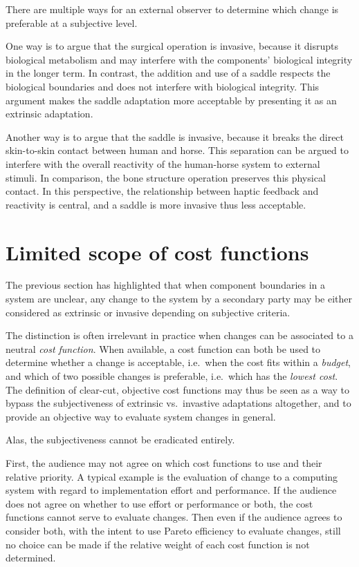 \documentclass[a4paper]{article}
\newcommand{\ie}{i.e.~}
\newcommand{\vs}{vs.~}
\begin{document}
There are multiple ways for an external observer to determine which
change is preferable at a subjective level.

One way is to argue that the surgical operation is invasive, because
it disrupts biological metabolism and may interfere with the
components' biological integrity in the longer term. In contrast, the
addition and use of a saddle respects the biological boundaries and
does not interfere with biological integrity. This argument makes the saddle
adaptation more acceptable by presenting it as an extrinsic
adaptation.

Another way is to argue that the saddle is invasive, because it breaks
the direct skin-to-skin contact between human and horse. This
separation can be argued to interfere with the overall reactivity of
the human-horse system to external stimuli. In comparison, the bone
structure operation preserves this physical contact. In this
perspective, the relationship between haptic feedback and reactivity
is central, and a saddle is more invasive thus less acceptable.

\section{Limited scope of cost functions}\label{sec:cost}

The previous section has highlighted that when component
boundaries in a system are unclear, any change to the system by a
secondary party may be either considered as extrinsic or invasive
depending on subjective criteria.

The distinction is often irrelevant in practice when changes can be
associated to a neutral \emph{cost function}. When available, a cost
function can both be used to determine whether a change is acceptable,
\ie when the cost fits within a \emph{budget}, and which of two
possible changes is preferable, \ie which has the \emph{lowest cost}.
The definition of clear-cut, objective cost functions may thus be seen
as a way to bypass the subjectiveness of extrinsic \vs invastive
adaptations altogether, and to provide an objective way to evaluate
system changes in general.

Alas, the subjectiveness cannot be eradicated entirely.

First, the audience may not agree on which cost functions to use and
their relative priority. A typical example is the evaluation of change
to a computing system with regard to implementation effort and
performance. If the audience does not agree on whether to use effort or
performance or both, the cost functions cannot serve to evaluate
changes. Then even if the audience agrees to consider both, with the
intent to use Pareto efficiency to evaluate changes, still no choice
can be made if the relative weight of each cost function is not
determined.
\end{document}
